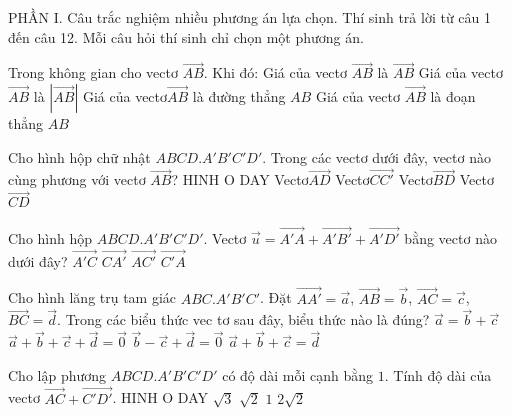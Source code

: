 PHẦN I. Câu trắc nghiệm nhiều phương án lựa chọn. Thí sinh trả lời từ câu 1 đến câu 12. Mỗi câu hỏi
thí sinh chỉ chọn một phương án.
\begin{ex}
	Trong không gian cho vectơ $\vec{AB}$. Khi đó:
	\choice
	{Giá của vectơ $\vec{AB}$ là $\vec{AB}$}
	{Giá của vectơ $\vec{AB}$ là $\left| \vec{AB} \right|$}
	{\True Giá của vectơ$\vec{AB}$ là đường thẳng $AB$}
	{Giá của vectơ $\vec{AB}$ là đoạn thẳng $AB$}
\end{ex}
\begin{ex}
	Cho hình hộp chữ nhật $ABCD.A'B'C'D'$. Trong các vectơ dưới đây, vectơ nào cùng phương với vectơ $\vec{AB}$?
	{\centering\color{red} HINH O DAY}
	\choice
	{Vectơ$\vec{AD}$}
	{Vectơ$\vec{CC'}$}
	{Vectơ$\vec{BD}$}
	{\True Vectơ$\vec{CD}$}
\end{ex}
\begin{ex}
	Cho hình hộp $ABCD.A'B'C'D'$. Vectơ $\vec{u}=\vec{A'A}+\vec{A'B'}+\vec{A'D'}$ bằng vectơ nào dưới đây?
	\choice
	{\True $\vec{A'C}$}
	{$\vec{CA'}$}
	{$\vec{AC'}$}
	{$\vec{C'A}$}
\end{ex}
\begin{ex}
	Cho hình lăng trụ tam giác $ABC.A'B'C'$. Đặt $\vec{AA'}=\vec{a}$, $\vec{AB}=\vec{b}$, $\vec{AC}=\vec{c}$, $\vec{BC}=\vec{d}$. Trong các biểu thức vec tơ sau đây, biểu thức nào là đúng?
	\choice
	{$\vec{a}=\vec{b}+\vec{c}$}
	{$\vec{a}+\vec{b}+\vec{c}+\vec{d}=\vec{0}$}
	{\True $\vec{b}-\vec{c}+\vec{d}=\vec{0}$}
	{$\vec{a}+\vec{b}+\vec{c}=\vec{d}$}
\end{ex}
\begin{ex}
	Cho lập phương $ABCD.A'B'C'D'$ có độ dài mỗi cạnh bằng $1$. Tính độ dài của vectơ $\vec{AC}+\vec{C'D'}$.
		{\centering\color{red} HINH O DAY}
	\choice
	{$\sqrt{3}$}
	{$\sqrt{2}$}
	{\True $1$}
	{$2\sqrt{2}$}
\end{ex}

